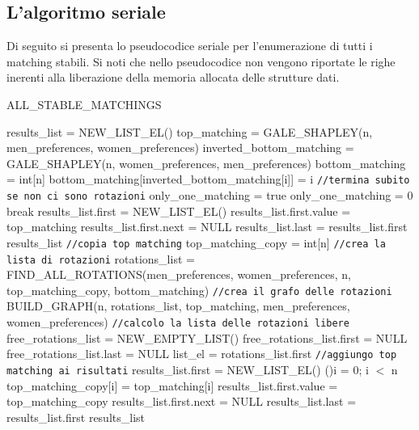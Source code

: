 \documentclass[12pt]{article}
\begin{document}
    \subsection{L'algoritmo seriale}
    Di seguito si presenta lo pseudocodice seriale per l'enumerazione di tutti i matching stabili. Si noti che nello pseudocodice non vengono riportate le righe inerenti alla liberazione della memoria allocata delle strutture dati.

    
    \begin{algorithm}[H]
        \scriptsize
        \DontPrintSemicolon
        \caption{ALL\_STABLE\_MATCHINGS}\label{alg:AllStableMatchings}
        \;
        results\_list = NEW\_LIST\_EL()\;
        top\_matching = GALE\_SHAPLEY(n, men\_preferences, women\_preferences)\;
        inverted\_bottom\_matching = GALE\_SHAPLEY(n, women\_preferences, men\_preferences)\;
        bottom\_matching = int[n]\;
         {
            bottom\_matching[inverted\_bottom\_matching[i]] = i\;
        }
        \;
        \texttt{//termina subito se non ci sono rotazioni}\;
        only\_one\_matching = true\;
         {
             {
			only\_one\_matching = 0\;
			break\;
		}
        }
         {
            results\_list.first = NEW\_LIST\_EL()\;
		results\_list.first.value = top\_matching\;
		results\_list.first.next = NULL\;
		results\_list.last = results\_list.first\;
		\Return results\_list\;
        }
        \;
        \texttt{//copia top matching}\;
        top\_matching\_copy = int[n]\;
        \;
        \texttt{//crea la lista di rotazioni}\;
        rotations\_list = FIND\_ALL\_ROTATIONS(men\_preferences, women\_preferences, n, top\_matching\_copy, bottom\_matching)\;
        \;
        \texttt{//crea il grafo delle rotazioni}\;
        BUILD\_GRAPH(n, rotations\_list, top\_matching, men\_preferences, women\_preferences)\;
        \;
        \texttt{//calcolo la lista delle rotazioni libere}\;
        free\_rotations\_list = NEW\_EMPTY\_LIST()\;
        free\_rotations\_list.first = NULL\;
        free\_rotations\_list.last = NULL\;
        list\_el = rotations\_list.first\;
        \;
        \texttt{//aggiungo top matching ai risultati}\;
        results\_list.first = NEW\_LIST\_EL()\;
        \For (){i = 0; i $<$ n}{
            top\_matching\_copy[i] = top\_matching[i]\;
        }
        results\_list.first.value = top\_matching\_copy\;
        results\_list.first.next = NULL\;
        results\_list.last = results\_list.first\;
        \;
        \;
        \Return results\_list\;
    \end{algorithm}
\end{document}
